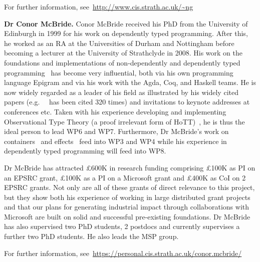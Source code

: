 \documentclass[a4paper,11pt]{article}
\newcommand{\eg}{{e.g.}\ }
\begin{document}





For further information, see~\url{http://www.cis.strath.ac.uk/~ng}

\textbf{Dr Conor McBride.} Conor McBride received his PhD from the
University of Edinburgh in 1999 for his work on dependently typed
programming. After this, he worked as an RA at the Universities of
Durham and Nottingham before becoming a lecturer at the University of
Strathclyde in 2008. His work on the foundations and implementations
of non-dependently and dependently typed programming~\cite{} has become very
influential, both via his own programming language Epigram and via his
work with the Agda, Coq, and Haskell teams. He is now widely regarded
as a leader of his field as illustrated by his widely cited papers
(\eg ~\cite{viewftl} has been cited 320 times) and invitations to keynote
addresses at conferences etc. Taken with his experience developing and
implementing Observational
Type Theory (a proof irrelevant form of HoTT)~\cite{}, he is thus the ideal
person to lead WP6 and WP7. Furthermore, Dr McBride's work 
on containers~\cite{} and effects~\cite{} feed into WP3 and WP4 while his
experience in dependently typed programming will feed into WP8.

Dr McBride has attracted \pounds 600K in research funding comprising
\pounds 100K as PI on an EPSRC grant, \pounds 100K as a PI on a
Microsoft grant and \pounds 400K as CoI on 2 EPSRC grants. Not only
are all of these grants of direct relevance to this project, but they
show both his experience of working in large distributed grant
projects and that our plans for generating industrial impact through
collaborations with Microsoft are built on solid and successful
pre-existing foundations. Dr McBride has also supervised two PhD
students, 2 postdocs and currently supervises a further two PhD students. He also
leads the MSP group.

For further information,
see~\url{https://personal.cis.strath.ac.uk/conor.mcbride/}
\end{document}
